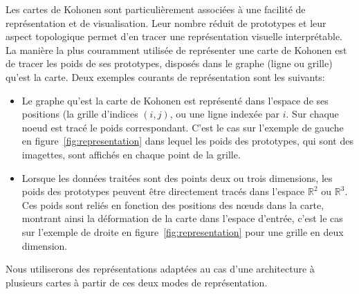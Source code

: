 \documentclass[../main]{subfiles}
\begin{document}
Les cartes de Kohonen sont particulièrement associées à une facilité de représentation et de visualisation. Leur nombre réduit de prototypes et leur aspect topologique permet d'en tracer une représentation visuelle interprétable.
La manière la plus couramment utilisée de représenter une carte de Kohonen est de tracer les poids de ses prototypes, disposés dans le graphe (ligne ou grille) qu'est la carte. Deux exemples courants de représentation sont les suivants: 
\begin{itemize}
\item Le graphe qu'est la carte de Kohonen est représenté dans l'espace de ses positions (la grille d'indices $(i,j)$, ou une ligne indexée par $i$. Sur chaque noeud est tracé le poids correspondant. C'est le cas sur l'exemple de gauche en figure~\ref{fig:representation} dans lequel les poids des prototypes, qui sont des imagettes, sont affichés en chaque point de la grille. 
\item Lorsque les données traitées sont des points deux ou trois dimensions, les poids des prototypes peuvent être directement tracés dans l'espace $\mathbb{R}^2$ ou $\mathbb{R}^3$. Ces poids sont reliés en fonction des positions des n\oe{}uds dans la carte, montrant ainsi la déformation de la carte dans l'espace d'entrée, c'est le cas sur l'exemple de droite en figure~\ref{fig:representation} pour une grille en deux dimension.
\end{itemize}
Nous utiliserons des représentations adaptées au cas d'une architecture à plusieurs cartes à partir de ces deux modes de représentation.
\end{document}

